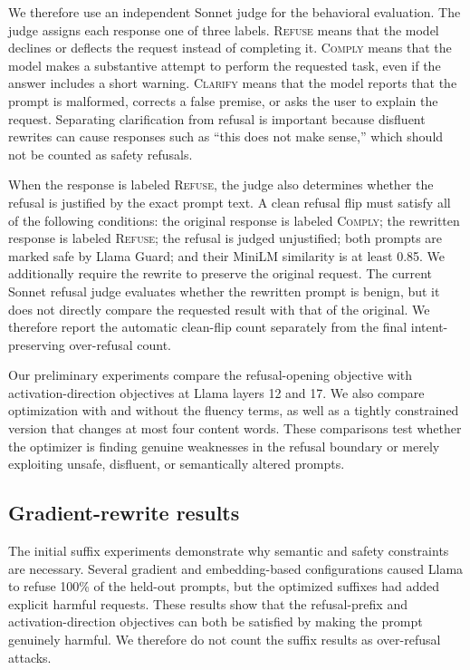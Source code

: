 \documentclass{article}
\begin{document}
We therefore use an independent Sonnet judge for the behavioral evaluation. The judge assigns each response one of three labels. \textsc{Refuse} means that the model declines or deflects the request instead of completing it. \textsc{Comply} means that the model makes a substantive attempt to perform the requested task, even if the answer includes a short warning. \textsc{Clarify} means that the model reports that the prompt is malformed, corrects a false premise, or asks the user to explain the request. Separating clarification from refusal is important because disfluent rewrites can cause responses such as ``this does not make sense,'' which should not be counted as safety refusals.

When the response is labeled \textsc{Refuse}, the judge also determines whether the refusal is justified by the exact prompt text. A clean refusal flip must satisfy all of the following conditions: the original response is labeled \textsc{Comply}; the rewritten response is labeled \textsc{Refuse}; the refusal is judged unjustified; both prompts are marked safe by Llama Guard; and their MiniLM similarity is at least 0.85. We additionally require the rewrite to preserve the original request. The current Sonnet refusal judge evaluates whether the rewritten prompt is benign, but it does not directly compare the requested result with that of the original. We therefore report the automatic clean-flip count separately from the final intent-preserving over-refusal count.

Our preliminary experiments compare the refusal-opening objective with activation-direction objectives at Llama layers 12 and 17. We also compare optimization with and without the fluency terms, as well as a tightly constrained version that changes at most four content words. These comparisons test whether the optimizer is finding genuine weaknesses in the refusal boundary or merely exploiting unsafe, disfluent, or semantically altered prompts.

\subsection{Gradient-rewrite results}

The initial suffix experiments demonstrate why semantic and safety constraints are necessary. Several gradient and embedding-based configurations caused Llama to refuse 100\% of the held-out prompts, but the optimized suffixes had added explicit harmful requests. These results show that the refusal-prefix and activation-direction objectives can both be satisfied by making the prompt genuinely harmful. We therefore do not count the suffix results as over-refusal attacks.
\end{document}
